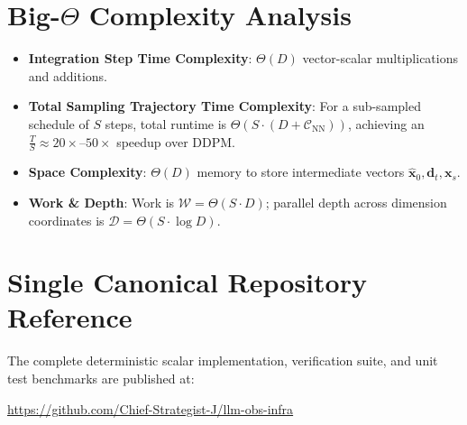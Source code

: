 \documentclass[11pt,a4paper]{article}
\theoremstyle{definition}
\begin{document}
\section{Big-$\Theta$ Complexity Analysis}

\begin{itemize}
    \item \textbf{Integration Step Time Complexity}: $\Theta(D)$ vector-scalar multiplications and additions.
    \item \textbf{Total Sampling Trajectory Time Complexity}: For a sub-sampled schedule of $S$ steps, total runtime is $\Theta(S \cdot (D + \mathcal{C}_{\text{NN}}))$, achieving an $\frac{T}{S} \approx 20\times\text{--}50\times$ speedup over DDPM.
    \item \textbf{Space Complexity}: $\Theta(D)$ memory to store intermediate vectors $\hat{\mathbf{x}}_0, \mathbf{d}_t, \mathbf{x}_s$.
    \item \textbf{Work \& Depth}: Work is $\mathcal{W} = \Theta(S \cdot D)$; parallel depth across dimension coordinates is $\mathcal{D} = \Theta(S \cdot \log D)$.
\end{itemize}

\section{Single Canonical Repository Reference}

The complete deterministic scalar implementation, verification suite, and unit test benchmarks are published at:
\begin{center}
\url{https://github.com/Chief-Strategist-J/llm-obs-infra}
\end{center}
\end{document}
